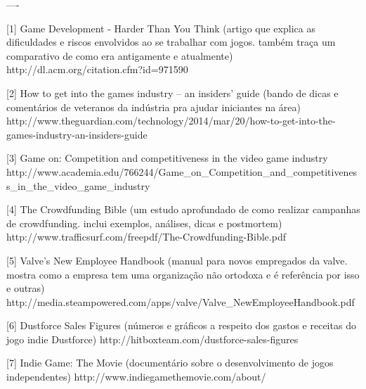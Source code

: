----

[1] Game Development - Harder Than You Think
(artigo que explica as dificuldades e riscos envolvidos ao se trabalhar com jogos. também traça um comparativo de como era antigamente e atualmente)
http://dl.acm.org/citation.cfm?id=971590

[2] How to get into the games industry – an insiders' guide
(bando de dicas e comentários de veteranos da indústria pra ajudar iniciantes na área)
http://www.theguardian.com/technology/2014/mar/20/how-to-get-into-the-games-industry-an-insiders-guide

[3] Game on: Competition and competitiveness in the video game industry
http://www.academia.edu/766244/Game_on_Competition_and_competitiveness_in_the_video_game_industry

[4] The Crowdfunding Bible
(um estudo aprofundado de como realizar campanhas de crowdfunding. inclui exemplos, análises, dicas e postmortem)
http://www.trafficsurf.com/freepdf/The-Crowdfunding-Bible.pdf

[5] Valve's New Employee Handbook
(manual para novos empregados da valve. mostra como a empresa tem uma organização não ortodoxa e é referência por isso e outras)
http://media.steampowered.com/apps/valve/Valve_NewEmployeeHandbook.pdf

[6] Dustforce Sales Figures
(números e gráficos a respeito dos gastos e receitas do jogo indie Dustforce)
http://hitboxteam.com/dustforce-sales-figures

[7] Indie Game: The Movie
(documentário sobre o desenvolvimento de jogos independentes)
http://www.indiegamethemovie.com/about/
